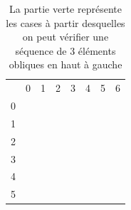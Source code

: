 \documentclass[a4paper, 11pt, oneside]{article}
\begin{document}
\begin{table}[ht]
\centering
\begin{tabular}{llllllll}
 & 0 & 1 & 2 & 3 & 4 & 5 & 6 \\ \cline{2-8} 
\multicolumn{1}{l|}{0} & \multicolumn{1}{l|}{\cellcolor[HTML]{FE0000}} & \multicolumn{1}{l|}{\cellcolor[HTML]{FE0000}} & \multicolumn{1}{l|}{\cellcolor[HTML]{FE0000}} & \multicolumn{1}{l|}{\cellcolor[HTML]{FE0000}} & \multicolumn{1}{l|}{\cellcolor[HTML]{FE0000}} & \multicolumn{1}{l|}{\cellcolor[HTML]{FE0000}} & \multicolumn{1}{l|}{\cellcolor[HTML]{FE0000}} \\ \cline{2-8} 
\multicolumn{1}{l|}{1} & \multicolumn{1}{l|}{\cellcolor[HTML]{FE0000}} & \multicolumn{1}{l|}{\cellcolor[HTML]{FE0000}} & \multicolumn{1}{l|}{\cellcolor[HTML]{FE0000}} & \multicolumn{1}{l|}{\cellcolor[HTML]{FE0000}} & \multicolumn{1}{l|}{\cellcolor[HTML]{FE0000}} & \multicolumn{1}{l|}{\cellcolor[HTML]{FE0000}} & \multicolumn{1}{l|}{\cellcolor[HTML]{FE0000}} \\ \cline{2-8} 
\multicolumn{1}{l|}{2} & \multicolumn{1}{l|}{\cellcolor[HTML]{FE0000}} & \multicolumn{1}{l|}{\cellcolor[HTML]{FE0000}} & \multicolumn{1}{l|}{\cellcolor[HTML]{FE0000}} & \multicolumn{1}{l|}{\cellcolor[HTML]{FE0000}} & \multicolumn{1}{l|}{\cellcolor[HTML]{FE0000}} & \multicolumn{1}{l|}{\cellcolor[HTML]{FE0000}} & \multicolumn{1}{l|}{\cellcolor[HTML]{FE0000}} \\ \cline{2-8} 
\multicolumn{1}{l|}{3} & \multicolumn{1}{l|}{\cellcolor[HTML]{FE0000}} & \multicolumn{1}{l|}{\cellcolor[HTML]{FE0000}} & \multicolumn{1}{l|}{\cellcolor[HTML]{FE0000}} & \multicolumn{1}{l|}{\cellcolor[HTML]{34FF34}} & \multicolumn{1}{l|}{\cellcolor[HTML]{34FF34}} & \multicolumn{1}{l|}{\cellcolor[HTML]{34FF34}} & \multicolumn{1}{l|}{\cellcolor[HTML]{34FF34}} \\ \cline{2-8} 
\multicolumn{1}{l|}{4} & \multicolumn{1}{l|}{\cellcolor[HTML]{FE0000}} & \multicolumn{1}{l|}{\cellcolor[HTML]{FE0000}} & \multicolumn{1}{l|}{\cellcolor[HTML]{FE0000}} & \multicolumn{1}{l|}{\cellcolor[HTML]{34FF34}} & \multicolumn{1}{l|}{\cellcolor[HTML]{34FF34}} & \multicolumn{1}{l|}{\cellcolor[HTML]{34FF34}} & \multicolumn{1}{l|}{\cellcolor[HTML]{34FF34}} \\ \cline{2-8} 
\multicolumn{1}{l|}{5} & \multicolumn{1}{l|}{\cellcolor[HTML]{FE0000}} & \multicolumn{1}{l|}{\cellcolor[HTML]{FE0000}} & \multicolumn{1}{l|}{\cellcolor[HTML]{FE0000}} & \multicolumn{1}{l|}{\cellcolor[HTML]{34FF34}} & \multicolumn{1}{l|}{\cellcolor[HTML]{34FF34}} & \multicolumn{1}{l|}{\cellcolor[HTML]{34FF34}} & \multicolumn{1}{l|}{\cellcolor[HTML]{34FF34}} \\ \cline{2-8} 
\end{tabular}
\caption{La partie verte représente les cases à partir desquelles on peut vérifier une séquence de 3 éléments obliques en haut à gauche}
\label{table-2}
\end{table}
\end{document}
